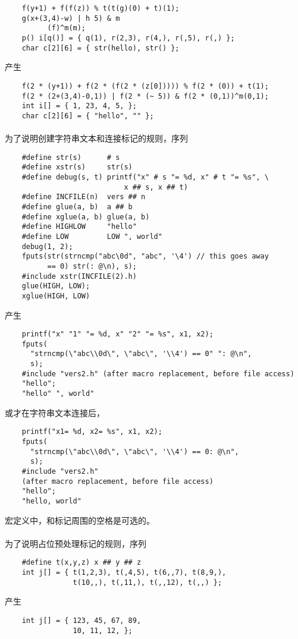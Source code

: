 {\begin{lstlisting}
    f(y+1) + f(f(z)) % t(t(g)(0) + t)(1);
    g(x+(3,4)-w) | h 5) & m
          (f)^m(m);
    p() i[q()] = { q(1), r(2,3), r(4,), r(,5), r(,) };
    char c[2][6] = { str(hello), str() };
\end{lstlisting}
产生
\begin{lstlisting}
    f(2 * (y+1)) + f(2 * (f(2 * (z[0])))) % f(2 * (0)) + t(1);
    f(2 * (2+(3,4)-0,1)) | f(2 * (~ 5)) & f(2 * (0,1))^m(0,1);
    int i[] = { 1, 23, 4, 5, };
    char c[2][6] = { "hello", "" };
\end{lstlisting}

\paragraph{}
\ex 为了说明创建字符串文本和连接标记的规则，序列
\begin{lstlisting}
    #define str(s)      # s
    #define xstr(s)     str(s)
    #define debug(s, t) printf("x" # s "= %d, x" # t "= %s", \
                            x ## s, x ## t)
    #define INCFILE(n)  vers ## n
    #define glue(a, b)  a ## b
    #define xglue(a, b) glue(a, b)
    #define HIGHLOW     "hello"
    #define LOW         LOW ", world"
    debug(1, 2);
    fputs(str(strncmp("abc\0d", "abc", '\4') // this goes away
          == 0) str(: @\n), s);
    #include xstr(INCFILE(2).h)
    glue(HIGH, LOW);
    xglue(HIGH, LOW)
\end{lstlisting}
产生
\begin{lstlisting}
    printf("x" "1" "= %d, x" "2" "= %s", x1, x2);
    fputs(
      "strncmp(\"abc\\0d\", \"abc\", '\\4') == 0" ": @\n",
      s);
    #include "vers2.h" (after macro replacement, before file access)
    "hello";
    "hello" ", world"
\end{lstlisting}
或才在字符串文本连接后，
\begin{lstlisting}
    printf("x1= %d, x2= %s", x1, x2);
    fputs(
      "strncmp(\"abc\\0d\", \"abc\", '\\4') == 0: @\n",
      s);
    #include "vers2.h"
    (after macro replacement, before file access)
    "hello";
    "hello, world"
\end{lstlisting}
宏定义中，\tm{\#}和\tm{\#\#}标记周围的空格是可选的。

\paragraph{}
\ex 为了说明占位预处理标记的规则，序列
\begin{lstlisting}
    #define t(x,y,z) x ## y ## z
    int j[] = { t(1,2,3), t(,4,5), t(6,,7), t(8,9,),
                t(10,,), t(,11,), t(,,12), t(,,) };
\end{lstlisting}
产生
\begin{lstlisting}
    int j[] = { 123, 45, 67, 89,
                10, 11, 12, };
\end{lstlisting}

}

